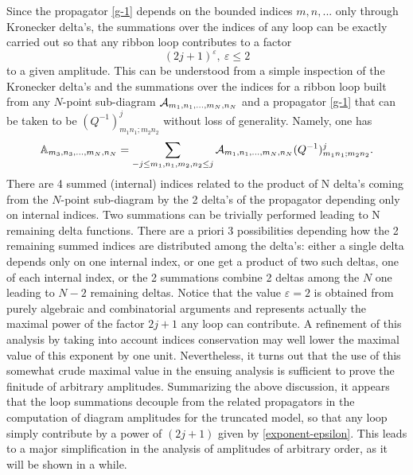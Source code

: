 \documentclass[11pt]{book}
\theoremstyle{break}
\begin{document}
Since the propagator \eqref{g-1} depends on the bounded indices $m,n,...$ only through Kronecker delta's, the summations over the indices of any loop can be exactly carried out so that any ribbon loop contributes to a factor 
\begin{equation}
(2j+1)^\varepsilon,\ \varepsilon\le2 \label{exponent-epsilon}
\end{equation}
to a given amplitude. This can be understood from a simple inspection of the Kronecker delta's and the summations over the indices for a ribbon loop built from any $N$-point sub-diagram ${\cal{A}}_{m_1,n_1,...,m_N,n_N}$ and a propagator \eqref{g-1} that can be taken to be $(Q^{-1})^j_{m_1n_1;m_2n_2}$ without loss of generality. Namely, one has
\begin{equation}
\mathbb{A}_{m_3,n_3,...,m_N,n_N}=\sum_{-j\le m_1,n_1,m_2,n_2\le j}{\cal{A}}_{m_1,n_1,...,m_N,n_N}(Q^{-1})^j_{m_1n_1;m_2n_2}\label{loop-sums}.
\end{equation}
There are 4 summed (internal) indices related to the product of N delta's 
coming from the $N$-point sub-diagram by the 2 delta's of the propagator depending only on internal indices. Two summations 
can be trivially performed leading to N remaining delta functions. There are a priori 3 possibilities depending how the 2 remaining summed indices are distributed among the delta's: either a single delta depends only on one internal index, or one get a product of two such deltas, one of each internal index, or
the 2 summations combine 2 deltas among the $N$ one leading to $N-2$ remaining deltas. Notice that the value $\varepsilon=2$ is obtained from purely algebraic and combinatorial arguments and represents actually the maximal power of the factor $2j+1$ any loop can contribute. A refinement of this analysis by taking into account indices conservation may well lower the maximal value of this exponent by one unit. Nevertheless, it turns out that the use of this somewhat crude maximal value in the ensuing analysis is sufficient to prove the finitude of arbitrary amplitudes. Summarizing the above discussion, it appears that the loop summations decouple from the related propagators in the computation of diagram amplitudes for the truncated model, so that any loop simply contribute by a power of $(2j+1)$ given by \eqref{exponent-epsilon}. This leads to a major simplification in the analysis of amplitudes of arbitrary order, as it will be shown in a while.\par
\end{document}

